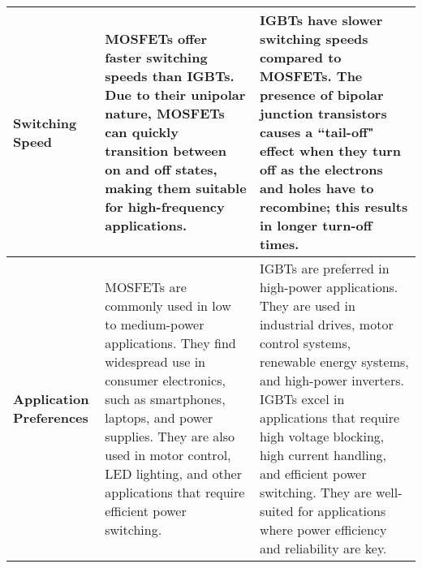 \begin{table}[tbh!]
{\begin{tabular}{|p{2.2cm}|p{7cm}|p{8cm}|}
\textbf{Switching Speed} & MOSFETs offer faster switching speeds than IGBTs. Due to their unipolar nature, MOSFETs can quickly transition between on and off states, making them suitable for high-frequency applications. & IGBTs have slower switching speeds compared to MOSFETs. The presence of bipolar junction transistors causes a ``tail-off" effect when they turn off as the electrons and holes have to recombine; this results in longer turn-off times. \\ \hline
\textbf{Application Preferences} & MOSFETs are commonly used in low to medium-power applications. They find widespread use in consumer electronics, such as smartphones, laptops, and power supplies. They are also used in motor control, LED lighting, and other applications that require efficient power switching. & IGBTs are preferred in high-power applications. They are used in industrial drives, motor control systems, renewable energy systems, and high-power inverters. IGBTs excel in applications that require high voltage blocking, high current handling, and efficient power switching. They are well-suited for applications where power efficiency and reliability are key. \\ \hline
\end{tabular}%
}
\end{table}